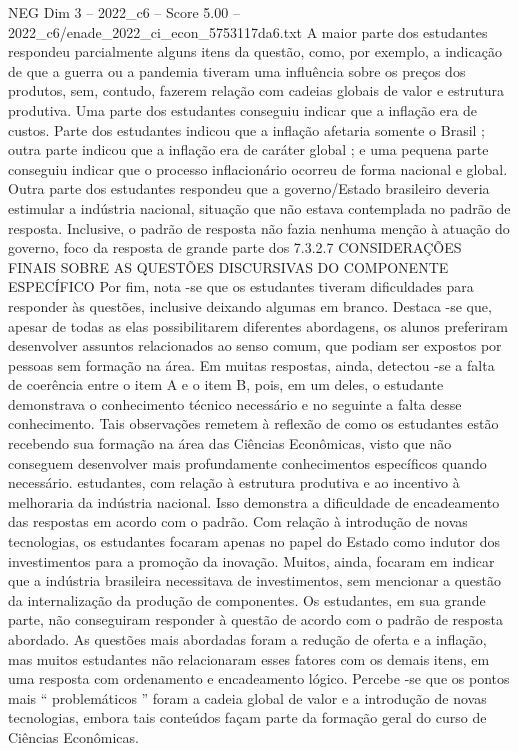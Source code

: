 \begin{textsample}{NEG Dim 3 – 2022\_c6 – Score 5.00 – 2022\_c6/enade\_2022\_ci\_econ\_5753117da6.txt}
A maior parte dos estudantes respondeu parcialmente alguns itens da questão, como, por exemplo, a indicação de que a guerra ou a pandemia tiveram uma influência sobre os preços dos produtos, sem, contudo, fazerem relação com cadeias globais de valor e estrutura produtiva.
Uma parte dos estudantes conseguiu indicar que a inflação era de custos.
Parte dos estudantes indicou que a inflação afetaria somente o Brasil ; outra parte indicou que a inflação era de caráter global ; e uma pequena parte conseguiu indicar que o processo inflacionário ocorreu de forma nacional e global.
Outra parte dos estudantes respondeu que a governo/Estado brasileiro deveria estimular a indústria nacional, situação que não estava contemplada no padrão de resposta.
Inclusive, o padrão de resposta não fazia nenhuma menção à atuação do governo, foco da resposta de grande parte dos 7.3.2.7 CONSIDERAÇÕES FINAIS SOBRE AS QUESTÕES DISCURSIVAS DO COMPONENTE ESPECÍFICO Por fim, nota -se que os estudantes tiveram dificuldades para responder às questões, inclusive deixando algumas em branco.
Destaca -se que, apesar de todas as elas possibilitarem diferentes abordagens, os alunos preferiram desenvolver assuntos relacionados ao senso comum, que podiam ser expostos por pessoas sem formação na área.
Em muitas respostas, ainda, detectou -se a falta de coerência entre o item A e o item B, pois, em um deles, o estudante demonstrava o conhecimento técnico necessário e no seguinte a falta desse conhecimento.
Tais observações remetem à reflexão de como os estudantes estão recebendo sua formação na área das Ciências Econômicas, visto que não conseguem desenvolver mais profundamente conhecimentos específicos quando necessário. estudantes, com relação à estrutura produtiva e ao incentivo à melhoraria da indústria nacional.
Isso demonstra a dificuldade de encadeamento das respostas em acordo com o padrão.
Com relação à introdução de novas tecnologias, os estudantes focaram apenas no papel do Estado como indutor dos investimentos para a promoção da inovação.
Muitos, ainda, focaram em indicar que a indústria brasileira necessitava de investimentos, sem mencionar a questão da internalização da produção de componentes.
Os estudantes, em sua grande parte, não conseguiram responder à questão de acordo com o padrão de resposta abordado.
As questões mais abordadas foram a redução de oferta e a inflação, mas muitos estudantes não relacionaram esses fatores com os demais itens, em uma resposta com ordenamento e encadeamento lógico.
Percebe -se que os pontos mais “ problemáticos ” foram a cadeia global de valor e a introdução de novas tecnologias, embora tais conteúdos façam parte da formação geral do curso de Ciências Econômicas.

\end{textsample}
